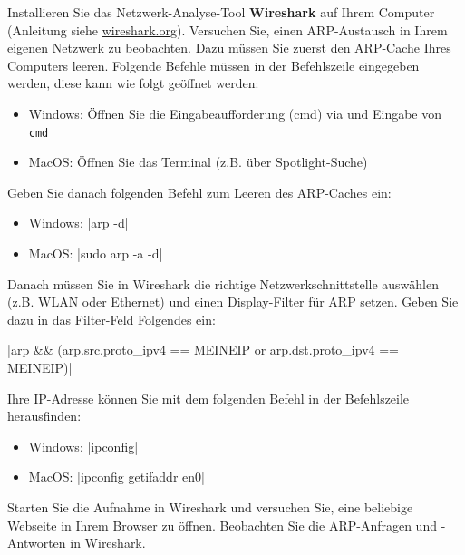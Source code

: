\begin{mychallenge}
	Installieren Sie das Netzwerk-Analyse-Tool \textbf{Wireshark} auf Ihrem Computer (Anleitung siehe \href{https://www.wireshark.org/download.html}{wireshark.org}). Versuchen Sie, einen \gls{ARP}-Austausch in Ihrem eigenen Netzwerk zu beobachten. Dazu müssen Sie zuerst den \gls{ARP}-Cache Ihres Computers leeren. Folgende Befehle müssen in der Befehlszeile eingegeben werden, diese kann wie folgt geöffnet werden:

	\begin{itemize}
		\item Windows: Öffnen Sie die Eingabeaufforderung (cmd) via  und Eingabe von \texttt{cmd}
		\item MacOS: Öffnen Sie das Terminal (z.B. über Spotlight-Suche)
	\end{itemize}

	Geben Sie danach folgenden Befehl zum Leeren des \gls{ARP}-Caches ein:
	\begin{itemize}
		\item Windows: \commandbox*|arp -d|
		\item MacOS: \commandbox*|sudo arp -a -d|
	\end{itemize}

	Danach müssen Sie in Wireshark die richtige Netzwerkschnittstelle auswählen (z.B. WLAN oder Ethernet) und einen Display-Filter für \gls{ARP} setzen. Geben Sie dazu in das Filter-Feld Folgendes ein:

	\commandbox|arp && (arp.src.proto_ipv4 == MEINEIP or arp.dst.proto_ipv4 == MEINEIP)|

	Ihre \gls{IP}-Adresse können Sie mit dem folgenden Befehl in der Befehlszeile herausfinden:

	\begin{itemize}
		\item Windows: \commandbox*|ipconfig|
		\item MacOS: \commandbox*|ipconfig getifaddr en0|
	\end{itemize}

	Starten Sie die Aufnahme in Wireshark und versuchen Sie, eine beliebige Webseite in Ihrem Browser zu öffnen. Beobachten Sie die \gls{ARP}-Anfragen und -Antworten in Wireshark.
\end{mychallenge}

